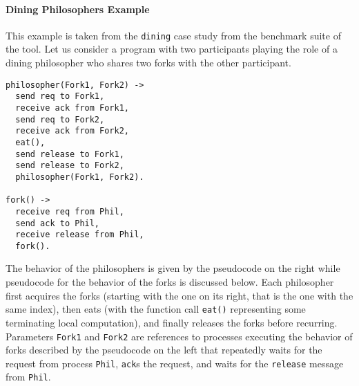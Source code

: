 \paragraph{Dining Philosophers Example}
This example is taken from the \texttt{dining} case study from the benchmark 
suite of the tool.
Let us consider a program with two participants playing the role of a
dining philosopher who shares two forks with the other participant.

\begin{lstlisting}
philosopher(Fork1, Fork2) ->
  send req to Fork1,
  receive ack from Fork1,
  send req to Fork2,
  receive ack from Fork2,
  eat(),
  send release to Fork1,
  send release to Fork2,
  philosopher(Fork1, Fork2).

fork() ->
  receive req from Phil,
  send ack to Phil,
  receive release from Phil,
  fork().
\end{lstlisting}
%
%

%
The behavior of the philosophers is given by the pseudocode on the
right while pseudocode for the behavior of the forks is discussed below.
Each philosopher first acquires the forks (starting with the one on
its right, that is the one with the same index), then eats (with the
function call \lstinline{eat()} representing some terminating local
computation), and finally releases the forks before recurring.
Parameters \lstinline{Fork1} and \lstinline{Fork2} are references to
processes executing the behavior of forks described by the pseudocode on the left
that repeatedly waits for the request from process \lstinline{Phil},
\lstinline{ack}s the request, and waits for the \lstinline{release}
message from \lstinline{Phil}.


